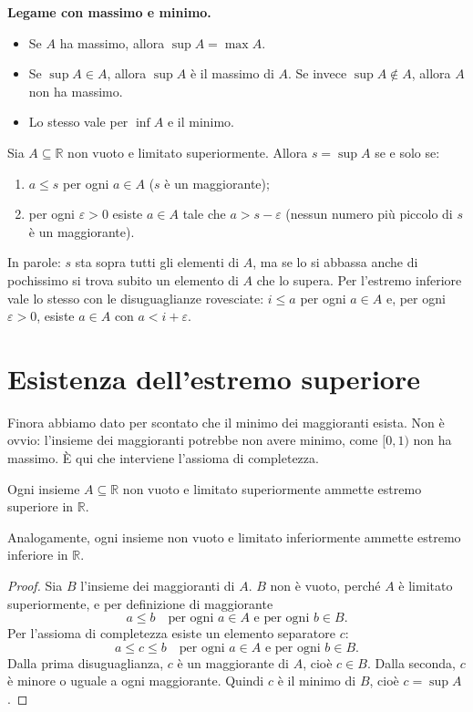 \documentclass[11pt,a4paper]{article}
\theoremstyle{definition}
\begin{document}
\textbf{Legame con massimo e minimo.}
\begin{itemize}
    \item Se $A$ ha massimo, allora $\sup A = \max A$.
    \item Se $\sup A \in A$, allora $\sup A$ è il massimo di $A$. Se invece
          $\sup A \notin A$, allora $A$ non ha massimo.
    \item Lo stesso vale per $\inf A$ e il minimo.
\end{itemize}

\begin{teorema}
Sia $A \subseteq \mathbb{R}$ non vuoto e limitato superiormente. Allora
$s = \sup A$ se e solo se:
\begin{enumerate}
    \item $a \leq s$ per ogni $a \in A$ \quad ($s$ è un maggiorante);
    \item per ogni $\varepsilon > 0$ esiste $a \in A$ tale che
          $a > s - \varepsilon$ \quad (nessun numero più piccolo di $s$ è
          un maggiorante).
\end{enumerate}
\end{teorema}

In parole: $s$ sta sopra tutti gli elementi di $A$, ma se lo si abbassa
anche di pochissimo si trova subito un elemento di $A$ che lo supera. Per
l'estremo inferiore vale lo stesso con le disuguaglianze rovesciate:
$i \leq a$ per ogni $a \in A$ e, per ogni $\varepsilon > 0$, esiste
$a \in A$ con $a < i + \varepsilon$.

\section{Esistenza dell'estremo superiore}

Finora abbiamo dato per scontato che il minimo dei maggioranti esista. Non è
ovvio: l'insieme dei maggioranti potrebbe non avere minimo, come $[0, 1)$ non
ha massimo. È qui che interviene l'assioma di completezza.

\begin{teorema}
Ogni insieme $A \subseteq \mathbb{R}$ non vuoto e limitato superiormente
ammette estremo superiore in $\mathbb{R}$.

Analogamente, ogni insieme non vuoto e limitato inferiormente ammette
estremo inferiore in $\mathbb{R}$.
\end{teorema}

\begin{proof}
Sia $B$ l'insieme dei maggioranti di $A$. $B$ non è vuoto, perché $A$ è
limitato superiormente, e per definizione di maggiorante
\[
a \leq b \quad \text{per ogni } a \in A \text{ e per ogni } b \in B.
\]
Per l'assioma di completezza esiste un elemento separatore $c$:
\[
a \leq c \leq b \quad \text{per ogni } a \in A \text{ e per ogni } b \in B.
\]
Dalla prima disuguaglianza, $c$ è un maggiorante di $A$, cioè $c \in B$.
Dalla seconda, $c$ è minore o uguale a ogni maggiorante. Quindi $c$ è il
minimo di $B$, cioè $c = \sup A$.
\end{proof}
\end{document}
